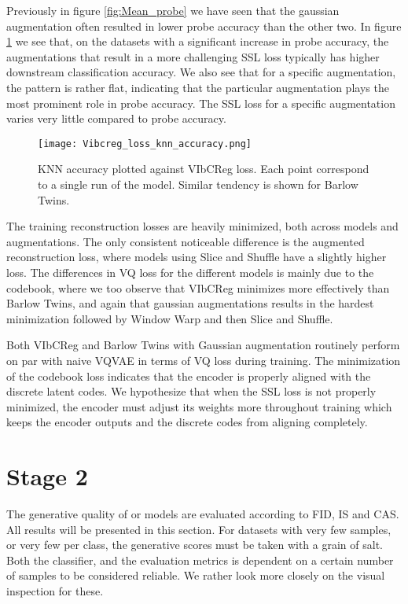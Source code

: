\documentclass[../../thesis.tex]{subfiles}
\begin{document}
Previously in figure \ref{fig:Mean_probe} we have seen that the gaussian augmentation often resulted in lower probe accuracy than the other two. In figure \ref{fig:Vibcreg_loss_knn_accuracy} we see that, on the datasets with a significant increase in probe accuracy, the augmentations that result in a more challenging SSL loss typically has higher downstream classification accuracy. We also see that for a specific augmentation, the pattern is rather flat, indicating that the particular augmentation plays the most prominent role in probe accuracy. The SSL loss for a specific augmentation varies very little compared to probe accuracy. \newline

\begin{figure}[h]
    \texttt{[image: Vibcreg\_loss\_knn\_accuracy.png]}
    \centering  
    \caption{KNN accuracy plotted against VIbCReg loss. Each point correspond to a single run of the model. Similar tendency is shown for Barlow Twins.}
    \label{fig:Vibcreg_loss_knn_accuracy}
\end{figure}

The training reconstruction losses are heavily minimized, both across models and augmentations. The only consistent noticeable difference is the augmented reconstruction loss, where models using Slice and Shuffle have a slightly higher loss. The differences in VQ loss for the different models is mainly due to the codebook, where we too observe that VIbCReg minimizes more effectively than Barlow Twins, and again that gaussian augmentations results in the hardest minimization followed by Window Warp and then Slice and Shuffle.\newline 

Both VIbCReg and Barlow Twins with Gaussian augmentation routinely perform on par with naive VQVAE in terms of VQ loss during training. The minimization of the codebook loss indicates that the encoder is properly aligned with the discrete latent codes. We hypothesize that when the SSL loss is not properly minimized, the encoder must adjust its weights more throughout training which keeps the encoder outputs and the discrete codes from aligning completely. 

\section{Stage 2}
The generative quality of or models are evaluated according to FID, IS and CAS. All results will be presented in this section. For datasets with very few samples, or very few per class, the generative scores must be taken with a grain of salt. Both the classifier, and the evaluation metrics is dependent on a certain number of samples to be considered reliable. We rather look more closely on the visual inspection for these.  
\end{document}
